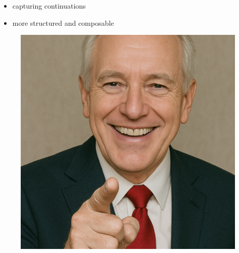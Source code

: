 \begin{frame}[fragile]
\begin{minipage}[t]{.60\textwidth}
		\begin{itemize}
			\item[\emoji{check-mark-button}] capturing  continuations
			\item[\emoji{check-mark-button}] more structured and composable
		\end{itemize}
	\end{minipage}
	\begin{minipage}[t]{.30\textwidth}
		\begin{figure}[h]
			\includegraphics[width=\textwidth]{img/pointing-smile-man.png}
		\end{figure}
	\end{minipage}
\end{frame}

